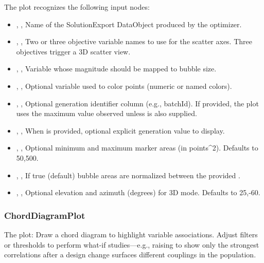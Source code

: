 The  plot recognizes the following input nodes:
\begin{itemize}
  \item {}, , Name of the SolutionExport DataObject produced by the optimizer.
  \item {}, , Two or three objective variable names to use for the scatter axes. Three objectives trigger a 3D scatter view.
  \item {}, , Variable whose magnitude should be mapped to bubble size.
  \item {}, , Optional variable used to color points (numeric or named colors).
  \item {}, , Optional generation identifier column (e.g., batchId). If provided, the plot uses the maximum value observed unless  is also supplied.
  \item {}, , When  is provided, optional explicit generation value to display.
  \item {}, , Optional minimum and maximum marker areas (in points\textasciicircum{}2). Defaults to 50,500.
  \item {}, , If true (default) bubble areas are normalized between the provided .
  \item {}, , Optional elevation and azimuth (degrees) for 3D mode. Defaults to 25,-60.
\end{itemize}

\subsubsection{ChordDiagramPlot}
The   plot: Draw a chord diagram to highlight variable associations. Adjust filters or thresholds to perform what-if studies---e.g., raising  to show only the strongest correlations after a design change surfaces different couplings in the population.

